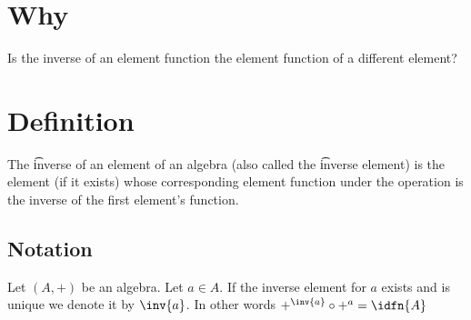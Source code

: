 

\section*{Why}

Is the inverse of an element function the element function of a different element?

\section*{Definition}

The \t{inverse} of an element of an algebra (also called the \t{inverse element}) is the element (if it exists) whose corresponding element function under the operation is the inverse of the first element's function.

\subsection*{Notation}

Let $(A, +)$ be an algebra.
Let $a \in A$.
If the inverse element for $a$ exists and is unique we denote it by $\inv{a}$.
In other words $+^{\inv{a}} \circ +^{a} = \idfn{A}$

\blankpage